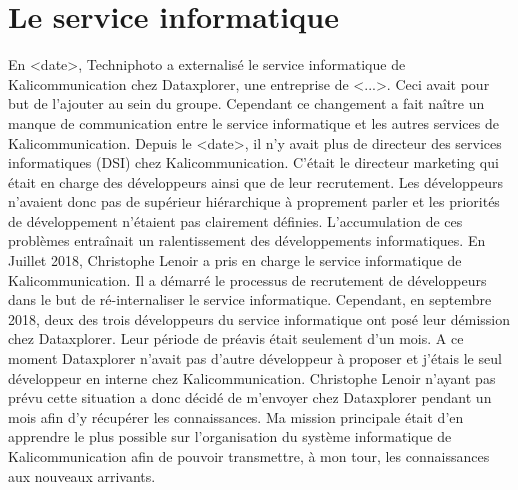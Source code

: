 \section{Le service informatique}
En <date>, Techniphoto a externalisé le service informatique de Kalicommunication chez Dataxplorer, une entreprise de <...>. Ceci avait pour but de l'ajouter au sein du groupe. Cependant ce changement a fait naître un manque de communication entre le service informatique et les autres services de Kalicommunication.\newline
Depuis le <date>, il n'y avait plus de directeur des services informatiques (DSI) chez Kalicommunication. C'était le directeur marketing qui était en charge des développeurs ainsi que de leur recrutement. Les développeurs n'avaient donc pas de supérieur hiérarchique à proprement parler et les priorités de développement n'étaient pas clairement définies. L'accumulation de ces problèmes entraînait un ralentissement des développements informatiques.\newline
En Juillet 2018, Christophe Lenoir a pris en charge le service informatique de Kalicommunication. Il a démarré le processus de recrutement de développeurs dans le but de ré-internaliser le service informatique.\newline
Cependant, en septembre 2018, deux des trois développeurs du service informatique ont posé leur démission chez Dataxplorer. Leur période de préavis était seulement d'un mois. A ce moment Dataxplorer n'avait pas d'autre développeur à proposer et j'étais le seul développeur en interne chez Kalicommunication. Christophe Lenoir n'ayant pas prévu cette situation a donc décidé de m'envoyer chez Dataxplorer pendant un mois afin d'y récupérer les connaissances.\newline
Ma mission principale était d'en apprendre le plus possible sur l'organisation du système informatique de Kalicommunication afin de pouvoir transmettre, à mon tour, les connaissances aux nouveaux arrivants.